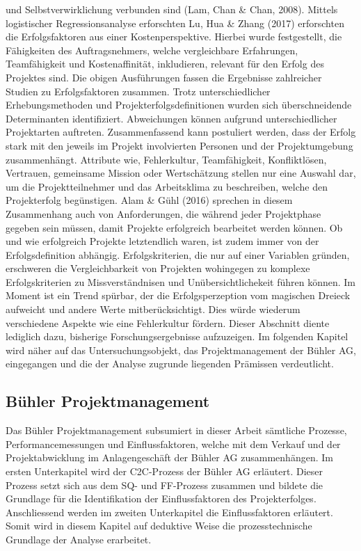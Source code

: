 \documentclass[11pt]{article}
\begin{document}
und Selbstverwirklichung verbunden sind (Lam, Chan \& Chan, 2008). Mittels logistischer Regressionsanalyse erforschten Lu, Hua \& Zhang (2017) erforschten die Erfolgsfaktoren aus einer Kostenperspektive. Hierbei wurde festgestellt, die Fähigkeiten des Auftragsnehmers, welche vergleichbare Erfahrungen, Teamfähigkeit und Kostenaffinität, inkludieren, relevant für den Erfolg des Projektes sind. Die obigen Ausführungen fassen die Ergebnisse zahlreicher Studien zu Erfolgsfaktoren zusammen. Trotz unterschiedlicher Erhebungsmethoden und Projekterfolgsdefinitionen wurden sich überschneidende Determinanten identifiziert. Abweichungen können aufgrund unterschiedlicher Projektarten auftreten. Zusammenfassend kann postuliert werden, dass der Erfolg stark mit den jeweils im Projekt involvierten Personen und der Projektumgebung zusammenhängt. Attribute wie, Fehlerkultur, Teamfähigkeit, Konfliktlösen, Vertrauen, gemeinsame Mission oder Wertschätzung stellen nur eine Auswahl dar, um die Projektteilnehmer und das Arbeitsklima zu beschreiben, welche den Projekterfolg begünstigen. Alam \& Gühl (2016) sprechen in diesem Zusammenhang auch von Anforderungen, die während jeder Projektphase gegeben sein müssen, damit Projekte erfolgreich bearbeitet werden können. Ob und wie erfolgreich Projekte letztendlich waren, ist zudem immer von der Erfolgsdefinition abhängig. Erfolgskriterien, die nur auf einer Variablen gründen, erschweren die Vergleichbarkeit von Projekten wohingegen zu komplexe Erfolgskriterien zu Missverständnisen und Unübersichtlichekeit führen können. Im Moment ist ein Trend spürbar, der die Erfolgsperzeption vom magischen Dreieck aufweicht und andere Werte mitberücksichtigt. Dies würde wiederum verschiedene Aspekte wie eine Fehlerkultur fördern. Dieser Abschnitt diente lediglich dazu, bisherige Forschungsergebnisse aufzuzeigen. Im folgenden Kapitel wird näher auf das Untersuchungsobjekt, das Projektmanagement der Bühler AG, eingegangen und die der Analyse zugrunde liegenden Prämissen verdeutlicht. 

\subsection{Bühler Projektmanagement}

Das Bühler Projektmanagement subsumiert in dieser Arbeit sämtliche Prozesse, Performancemessungen und Einflussfaktoren, welche mit dem Verkauf und der Projektabwicklung im Anlagengeschäft der Bühler AG zusammenhängen. Im ersten Unterkapitel wird der C2C-Prozess der Bühler AG erläutert. Dieser Prozess setzt sich aus dem SQ- und FF-Prozess zusammen und bildete die Grundlage für die Identifikation der Einflussfaktoren des Projekterfolges. Anschliessend werden im zweiten Unterkapitel die Einflussfaktoren erläutert. Somit wird in diesem Kapitel auf deduktive Weise die prozesstechnische Grundlage der Analyse erarbeitet.
\end{document}
